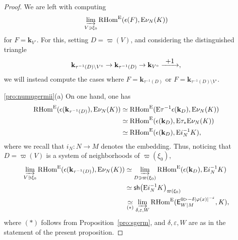 \documentclass[11pt]{article}
\numberwithin{equation}{section}
\newcommand{\To}[1][]{\mathchoice{\xrightarrow{\textstyle\kern4pt#1\kern3pt}}{\stackrel{#1}{\longrightarrow}}{}{}}
\newcommand{\bl}{\bigl(}
\newcommand{\br}{\bigr)}
\theoremstyle{plain}
\theoremstyle{definition}
\newcommand{\derived}[1]{\mathrm{#1}}
\newcommand{\derr}{\derived{R}}
\newcommand{\RHom}[1][]{\derr\mathrm{Hom}_{\raise1.5ex\hbox to.1em{}#1}}
\newcommand{\FHom}{\RHom^\enh}
\newcommand{\Eopb}[1]{\enh#1^{-1}}
\newcommand{\Eoim}[1]{\enh#1_*}
\newcommand{\Enu}{\enh\nu}
\newcommand{\field}{\mathbf{k}}\let\cor\field
\newcommand{\range}[2]{#1 \mathbin{\rhd} #2}
\newcommand{\sh}{\mathsf{sh}}
\newcommand{\ilim}[1][]{\mathop{\varinjlim}\limits_{#1}}
\begin{document}
\begin{proof}
We are left with computing
\[
\ilim[V\owns\xi_0] \FHom(\epsilon(F),\Enu_N(K))
\]
for
$F=\field_{V^\circ}$.
For this, setting $D=\varpi(V)$, and considering the distinguished triangle
\[
\field_{\tau^{-1}(D)\setminus V^\circ} \to
\field_{\tau^{-1}(D)} \to
\field_{V^\circ} \To[+1],
\]
we will instead compute the cases where
$F=\field_{\tau^{-1}(D)}$ or $F=\field_{\tau^{-1}(D)\setminus V^\circ}$.

\eqref{pro:numugermii}(a)
On one hand, one has
\begin{align*}
\FHom(\epsilon(\field_{\tau^{-1}(D)}),\Enu_N(K))
&\simeq \FHom(\Eopb\tau \epsilon(\field_{D}),\Enu_N(K)) \\
&\simeq \FHom(\epsilon(\field_{D}),\Eoim\tau \Enu_N(K)) \\
&\simeq \FHom(\epsilon(\field_{D}),\Eopb i_N K),
\end{align*}
where we recall that $i_N\colon N\to M$ denotes the embedding.
Thus, noticing that $D=\varpi(V)$ is a system of neighborhoods of $\varpi(\xi_0)$,
\begin{align*}
\ilim[V\owns\xi_0] \FHom(\epsilon(\field_{\tau^{-1}(D)}),\Enu_N(K))
&\simeq \ilim[D\owns \varpi(\xi_0)] \FHom(\epsilon(\field_{D}),\Eopb i_N K) \\
&\simeq \sh\bl\Eopb i_N K\br_{\varpi(\xi_0)} \\
&\underset{(*)}\simeq \ilim[\delta,\varepsilon,W]
\FHom( \exx^{\range0{-\delta|\varphi(x)|^{-\varepsilon}}}_{W|M} , K),
\end{align*}
where $(*)$ follows from Proposition~\ref{pro:sgerm}, and $\delta,\varepsilon,W$ are as in the statement of the present proposition.


\end{proof}
\end{document}
